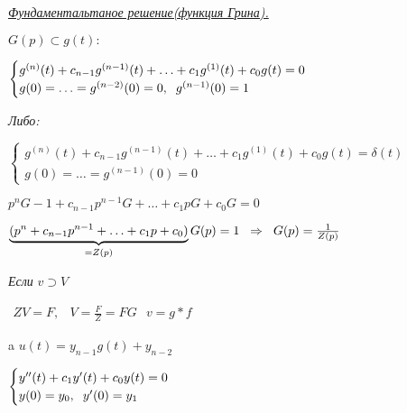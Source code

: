 \newpage
\begin{LARGE}
\textit{\underline{Фундаментальтаное решение(функция Грина).}}
\end{LARGE}

\vspace{0.5cm}
$
G(p) \subset g(t) :
$

\vspace{0.5cm}
$
\begin{cases}
	g^{(n)}(t) + c_{n-1}g^{(n-1)}(t)+\ldots + c_1g^{(1)}(t) +c_0g(t) = 0 \\
	g(0) =  \ldots =g^{(n-2)}(0) = 0,\text{\hspace{0.2cm}} g^{(n-1)}(0) = 1
\end{cases}
$

\vspace{0.5cm}
\begin{Large}
\textit{Либо:}
\end{Large}

\vspace{0.5cm}
$
\begin{cases}
	g^{(n)}(t) + c_{n-1}g^{(n-1)}(t)+\ldots + c_1g^{(1)}(t) +c_0g(t) = \delta(t)\\
	g(0) =  \ldots =g^{(n-1)}(0) = 0
\end{cases}
$

\vspace{0.5cm}
$
p^n G - 1 + c_{n-1}p^{n-1}G + \ldots + c_1pG +c_0G = 0
$

\vspace{0.5cm}
$
\underbrace{(p^n + c_{n-1}p^{n-1} + \ldots + c_1p + c_0)}_{ = Z(p)} G(p) = 1 \text{\hspace{0.2cm}} \Rightarrow \text{\hspace{0.2cm}} G(p) = \frac{1}{Z(p)}
$

\vspace{0.5cm}
\textit{Если \text{\hspace{0.2cm}}}
$
v \supset V
$

$
\begin{matrix}
ZV=F, & V = \frac{F}{Z} = FG
\end{matrix}
$
\text{\hspace{2cm}}
$
v = g\ast f
$

\vspace{0.5cm}
a\text{\hspace{0.2cm}}
$
u(t) = y_{n-1}g(t) + y_{n-2}
$

\vspace{0.5cm}
$
\begin{cases}
	y^{\prime\prime}(t) + c_1y^{\prime}(t) + c_0y(t) = 0 \\
	y(0) = y_0,\text{\hspace{0.2cm}}y^{\prime}(0) = y_1
\end{cases}
$

